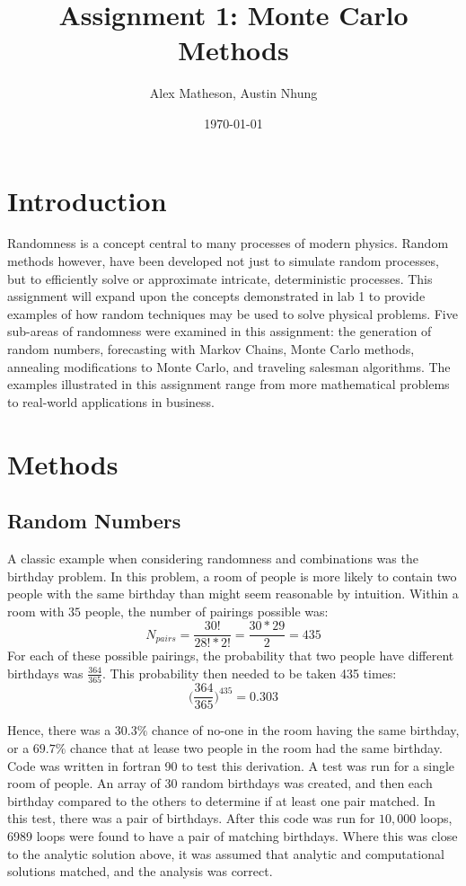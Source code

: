 \documentclass[twocolumn]{article}
\begin{document}
\title{Assignment 1: Monte Carlo Methods}
\author{Alex Matheson, Austin Nhung}
\date{\today}
\maketitle

\section{Introduction}
Randomness is a concept central to many processes of modern physics. Random methods however, have been developed not just to simulate random processes, but to efficiently solve or approximate intricate, deterministic processes. This assignment will expand upon the concepts demonstrated in lab 1 to provide examples of how random techniques may be used to solve physical problems. Five sub-areas of randomness were examined in this assignment: the generation of random numbers, forecasting with Markov Chains, Monte Carlo methods, annealing modifications to Monte Carlo, and traveling salesman algorithms. The examples illustrated in this assignment range from more mathematical problems to real-world applications in business.

\section{Methods}
\subsection{Random Numbers}
A classic example when considering randomness and combinations was the birthday problem. In this problem, a room of people is more likely to contain two people with the same birthday than might seem reasonable by intuition. Within a room with $35$ people, the number of pairings possible was:
\begin{equation}
N_{pairs} = \frac{30!}{28!*2!} = \frac{30*29}{2} = 435
\end{equation}
For each of these possible pairings, the probability that two people have different birthdays was $\frac{364}{365}$. This probability then needed to be taken 435 times:
\begin{equation}
\bigg( \frac{364}{365} \bigg)^{435} = 0.303
\end{equation}

Hence, there was a $30.3\% $ chance of no-one in the room having the same birthday, or a $69.7\%$ chance that at lease two people in the room had the same birthday. Code was written in fortran 90 to test this derivation. A test was run for a single room of people. An array of 30 random birthdays was created, and then each birthday compared to the others to determine if at least one pair matched. In this test, there was a pair of birthdays. After this code was run for $10,000$ loops, 6989 loops were found to have a pair of matching birthdays. Where this was close to the analytic solution above, it was assumed that analytic and computational solutions matched, and the analysis was correct.
\end{document}
